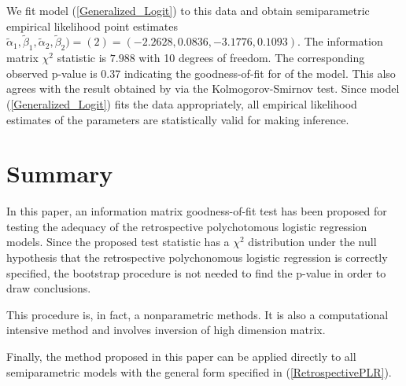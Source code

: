 \documentclass[11pt]{article}
\theoremstyle{plain}
\theoremstyle{definition}
\theoremstyle{remark}
\theoremstyle{definition}
\begin{document}
We fit model (\ref{Generalized_Logit}) to this data and obtain semiparametric empirical likelihood point estimates
$\tilde{\alpha}_1, \tilde{\beta}_1, \tilde{\alpha}_2, \tilde{\beta}_2)=(2)=(-2.2628, 0.0836, -3.1776, 0.1093)$. The information matrix $\chi^2$ statistic is $7.988$ with 10 degrees of freedom. The corresponding observed p-value is 0.37 indicating the goodness-of-fit for of the model. This also agrees with the result obtained by \cite{ZhangBiao-JMA-2002} via the Kolmogorov-Smirnov test. Since model (\ref{Generalized_Logit}) fits the data appropriately, all empirical likelihood estimates of the parameters are statistically valid for making inference.

\section{Summary}
In this paper, an information matrix goodness-of-fit test has been proposed for testing the adequacy of the retrospective polychotomous logistic regression models. Since the proposed test statistic has a $\chi^2$ distribution under the null hypothesis that the retrospective polychonomous logistic regression is correctly specified, the bootstrap procedure is not needed to find the p-value in order to draw conclusions.

This procedure is, in fact, a nonparametric methods. It is also a computational intensive method and involves inversion of high dimension matrix.

Finally, the method proposed in this paper can be applied directly to all semiparametric models with the general form specified in (\ref{RetrospectivePLR}).


\end{document}
